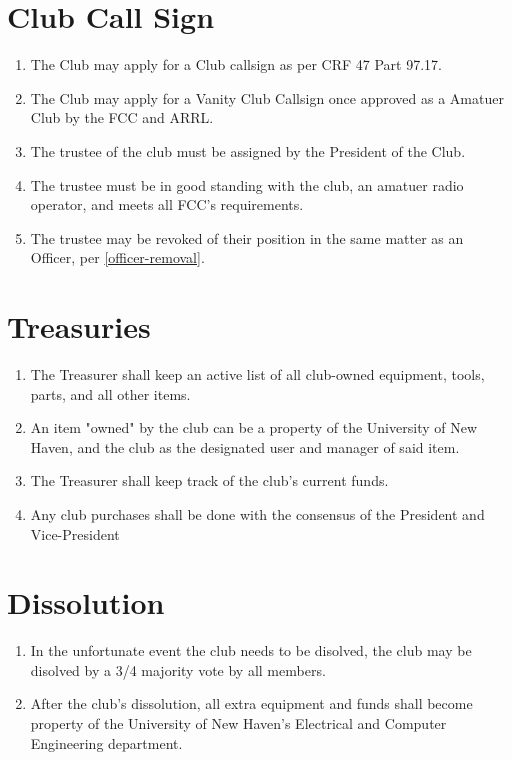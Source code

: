 \documentclass[a4paper,12pt]{article}
\begin{document}
\section{Club Call Sign}
\begin{enumerate}[label=\thesection.\arabic*.]
  \item The Club may apply for a Club callsign as per CRF 47 Part 97.17.
  \item The Club may apply for a Vanity Club Callsign once approved as a Amatuer Club by the FCC and ARRL.
  \item The trustee of the club must be assigned by the President of the Club.
  \item The trustee must be in good standing with the club, an amatuer radio operator, and meets all FCC's requirements.
  \item The trustee may be revoked of their position in the same matter as an Officer, per \cref{officer-removal}.
\end{enumerate}

\section{Treasuries}
\begin{enumerate}[label=\thesection.\arabic*.]
  \item The Treasurer shall keep an active list of all club-owned equipment, tools, parts, and all other items.
  \item An item "owned" by the club can be a property of the University of New Haven, and the club as the designated user and manager of said item.
  \item The Treasurer shall keep track of the club's current funds.
  \item Any club purchases shall be done with the consensus of the President and Vice-President
\end{enumerate}

\section{Dissolution}
\begin{enumerate}[label=\thesection.\arabic*.]
  \item In the unfortunate event the club needs to be disolved, the club may be disolved by a 3/4 majority vote by all members.
  \item After the club's dissolution, all extra equipment and funds shall become property of the University of New Haven's Electrical and Computer Engineering department.
\end{enumerate}
\end{document}
